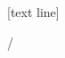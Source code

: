 [text line]{%
    \parbox{\linewidth}{\vspace*{-8pt}\hfill\hfill\insertpagenumber/\inserttotalframenumber}}

